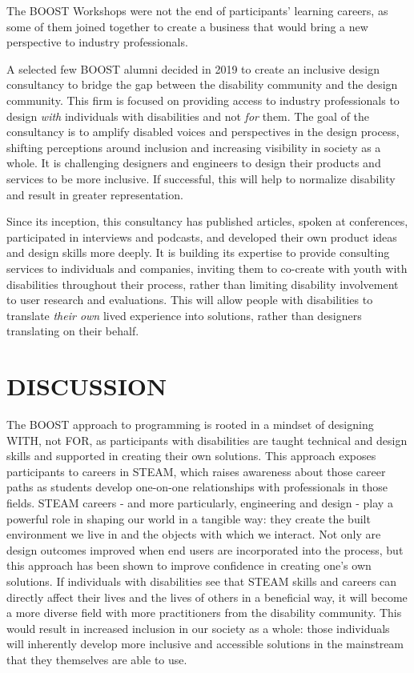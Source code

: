 \documentclass[11.5pt]{sig-alternate} %
\begin{document}
\begin{large}
The BOOST Workshops were not the end of participants’ learning careers, as some of them joined together to create a business that would bring a new perspective to industry professionals. 

A selected few BOOST alumni decided in 2019 to create an inclusive design consultancy to bridge the gap between the disability community and the design community. This firm is focused on providing access to industry professionals to design \textit{with} individuals with disabilities and not \textit{for} them. The goal of the consultancy is to amplify disabled voices and perspectives in the design process, shifting perceptions around inclusion and increasing visibility in society as a whole. It is challenging designers and engineers to design their products and services to be more inclusive. If successful, this will help to normalize disability and result in greater representation. 

Since its inception, this consultancy has published articles, spoken at conferences, participated in interviews and podcasts, and developed their own product ideas and design skills more deeply. It is building its expertise to provide consulting services to individuals and companies, inviting them to co-create with youth with disabilities throughout their process, rather than limiting disability involvement to user research and evaluations. This will allow people with disabilities to translate \textit{their own} lived experience into solutions, rather than designers translating on their behalf.  

\section*{DISCUSSION}

The BOOST approach to programming is rooted in a mindset of designing WITH, not FOR, as participants with disabilities are taught technical and design skills and supported in creating their own solutions. This approach exposes participants to careers in STEAM, which raises awareness about those career paths as students develop one-on-one relationships with professionals in those fields. STEAM careers - and more particularly, engineering and design - play a powerful role in shaping our world in a tangible way: they create the built environment we live in and the objects with which we interact. Not only are design outcomes improved when end users are incorporated into the process, but this approach has been shown to improve confidence in creating one’s own solutions. If individuals with disabilities see that STEAM skills and careers can directly affect their lives and the lives of others in a beneficial way, it will become a more diverse field with more practitioners from the disability community. This would result in increased inclusion in our society as a whole: those individuals will inherently develop more inclusive and accessible solutions in the mainstream that they themselves are able to use.   


\end{large}
\end{document}

